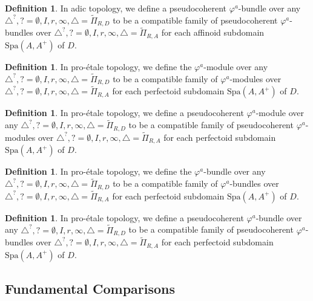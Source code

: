 \documentclass[12pt]{amsart}
\theoremstyle{definition}
\newtheorem{definition}[theorem]{Definition}
\numberwithin{equation}{section}
\begin{document}
\begin{definition}
In adic topology, we define a pseudocoherent $\varphi^a$-bundle over any $\triangle^?,?=\emptyset,I,r,\infty,\triangle=\widetilde{\Pi}_{R,D}$ to be a compatible family of pseudocoherent $\varphi^a$-bundles over $\triangle^?,?=\emptyset,I,r,\infty,\triangle=\widetilde{\Pi}_{R,A}$ for each affinoid subdomain $\mathrm{Spa}(A,A^+)$ of $D$.	
\end{definition}


\begin{definition}
In pro-\'etale topology, we define the $\varphi^a$-module over any $\triangle^?,?=\emptyset,I,r,\infty,\triangle=\widetilde{\Pi}_{R,D}$ to be a compatible family of $\varphi^a$-modules over $\triangle^?,?=\emptyset,I,r,\infty,\triangle=\widetilde{\Pi}_{R,A}$ for each perfectoid subdomain $\mathrm{Spa}(A,A^+)$ of $D$.	
\end{definition}


\begin{definition}
In pro-\'etale topology, we define a pseudocoherent $\varphi^a$-module over any $\triangle^?,?=\emptyset,I,r,\infty,\triangle=\widetilde{\Pi}_{R,D}$ to be a compatible family of pseudocoherent $\varphi^a$-modules over $\triangle^?,?=\emptyset,I,r,\infty,\triangle=\widetilde{\Pi}_{R,A}$ for each perfectoid subdomain $\mathrm{Spa}(A,A^+)$ of $D$.	
\end{definition}

\begin{definition}
In pro-\'etale topology, we define the $\varphi^a$-bundle over any $\triangle^?,?=\emptyset,I,r,\infty,\triangle=\widetilde{\Pi}_{R,D}$ to be a compatible family of $\varphi^a$-bundles over $\triangle^?,?=\emptyset,I,r,\infty,\triangle=\widetilde{\Pi}_{R,A}$ for each perfectoid subdomain $\mathrm{Spa}(A,A^+)$ of $D$.	
\end{definition}


\begin{definition}
In pro-\'etale topology, we define a pseudocoherent $\varphi^a$-bundle over any $\triangle^?,?=\emptyset,I,r,\infty,\triangle=\widetilde{\Pi}_{R,D}$ to be a compatible family of pseudocoherent $\varphi^a$-bundles over $\triangle^?,?=\emptyset,I,r,\infty,\triangle=\widetilde{\Pi}_{R,A}$ for each perfectoid subdomain $\mathrm{Spa}(A,A^+)$ of $D$.	
\end{definition}




\subsection{Fundamental Comparisons} \label{section3.2}
\end{document}

